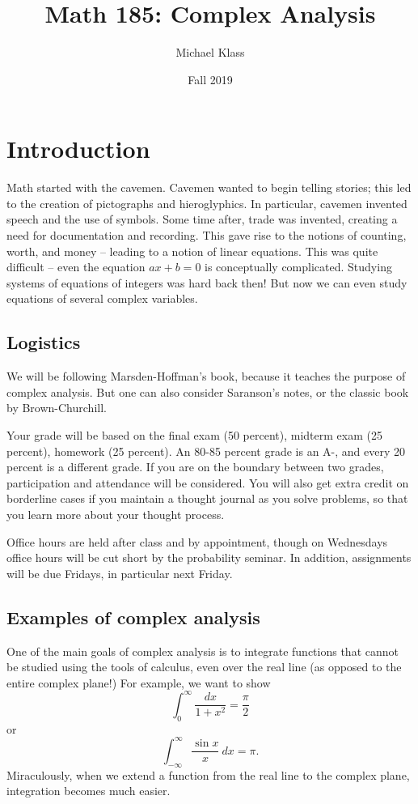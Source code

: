 \documentclass[12pt]{report}
\title{Math 185: Complex Analysis}
\author{Michael Klass}
\date{Fall 2019}
\theoremstyle{definition}
\theoremstyle{remark}
\begin{document}
\maketitle

\tableofcontents

\newpage

\chapter{Introduction}
Math started with the cavemen. Cavemen wanted to begin telling stories; this led to the creation of pictographs and hieroglyphics. In particular, cavemen invented speech and the use of symbols. Some time after, trade was invented, creating a need for documentation and recording. This gave rise to the notions of counting, worth, and money -- leading to a notion of linear equations. This was quite difficult -- even the equation $ax + b = 0$ is conceptually complicated. Studying systems of equations of integers was hard back then! But now we can even study equations of several complex variables.

\section{Logistics}
We will be following Marsden-Hoffman's book, because it teaches the purpose of complex analysis. But one can also consider Saranson's notes, or the classic book by Brown-Churchill.

Your grade will be based on the final exam (50 percent), midterm exam (25 percent), homework (25 percent). An 80-85 percent grade is an A-, and every 20 percent is a different grade. If you are on the boundary between two grades, participation and attendance will be considered. You will also get extra credit on borderline cases if you maintain a thought journal as you solve problems, so that you learn more about your thought process.

Office hours are held after class and by appointment, though on Wednesdays office hours will be cut short by the probability seminar. In addition, assignments will be due Fridays, in particular next Friday.

\section{Examples of complex analysis}
One of the main goals of complex analysis is to integrate functions that cannot be studied using the tools of calculus, even over the real line (as opposed to the entire complex plane!) For example, we want to show
$$\int_0^\infty \frac{dx}{1+x^2} = \frac{\pi}{2}$$
or
$$\int_{-\infty}^\infty \frac{\sin x}{x} ~dx = \pi.$$
Miraculously, when we extend a function from the real line to the complex plane, integration becomes much easier.
\end{document}
